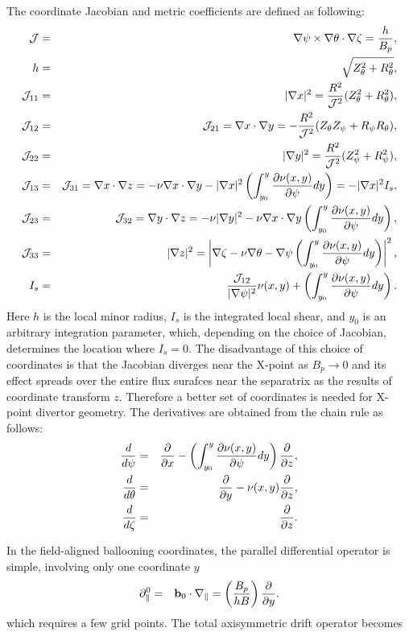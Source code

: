 \documentclass [11pt]{article}
\begin{document}
The coordinate Jacobian and metric coefficients are defined as following:
\begin{eqnarray}
{\cal J}&=&\nabla\psi\times\nabla\theta\cdot\nabla\zeta={h\over B_p}, \\
h&=&\sqrt{Z_\theta^2+R_\theta^2}, \\
{\cal J}_{11}&=&|\nabla x|^2={R^2\over {\cal J}^2}(Z_\theta^2+R_\theta^2), \\
{\cal J}_{12}&=&{\cal J}_{21}=\nabla x\cdot\nabla y=-{R^2\over {\cal J}^2}(Z_\theta Z_\psi+R_\psi R_\theta), \\
{\cal J}_{22}&=&|\nabla y|^2={R^2\over {\cal J}^2}(Z_\psi^2+R_\psi^2), \\
{\cal J}_{13}&=&{\cal J}_{31}=\nabla x\cdot\nabla z=-\nu\nabla x\cdot\nabla y-|\nabla x|^2\left(\int_{y_0}^y {\partial \nu(x,y)\over\partial\psi}dy\right)=-|\nabla x|^2I_s, \\
{\cal J}_{23}&=&{\cal J}_{32}=\nabla y\cdot\nabla z=-\nu|\nabla y|^2-\nu\nabla x\cdot\nabla y\left(\int_{y_0}^y {\partial \nu(x,y)\over\partial\psi}dy\right), \\
{\cal J}_{33}&=&|\nabla z|^2=\left |\nabla\zeta-\nu\nabla \theta-\nabla\psi\left(\int_{y_0}^y {\partial \nu(x,y)\over\partial\psi}dy\right)\right |^2, \\
I_s &=&  {{\cal J}_{12}\over|\nabla\psi|^2}\nu(x,y)+\left(\int_{y_0}^y {\partial \nu(x,y)\over\partial\psi}dy\right).
\end{eqnarray}
Here $h$ is the local minor radius, $I_s$ is the integrated local shear, and $y_0$ is an arbitrary integration parameter, which, depending on the choice of Jacobian, determines the location where $ I_s=0$. 
The disadvantage of this choice of coordinates is that
the Jacobian diverges near the X-point as $B_p\rightarrow 0$
and its effect spreads over the entire flux surafces
near the separatrix as the results of coordinate transform $z$.
Therefore a better set of coordinates is needed for X-point divertor geometry.
The derivatives are obtained from the chain rule as follows:
\begin{eqnarray}
{d\over d\psi}&=&{\partial\over \partial x} - \left(\int_{y_0}^y {\partial \nu(x,y)\over\partial\psi}dy\right){\partial\over \partial z},   \\ 
{d\over d\theta}&=&{\partial\over \partial y} - \nu(x,y){\partial\over \partial z},   \\ 
{d\over d\zeta}&=&{\partial\over \partial z}.
\end{eqnarray}

In the field-aligned ballooning coordinates, the parallel differential operator is simple, involving only one coordinate $y$
\begin{eqnarray}
\partial_\|^0 &=&  {\bf b}_0\cdot\nabla_\|=\left({B_p\over hB}\right){\partial\over\partial y}.
\end{eqnarray}
which requires a few grid points.
The total axisymmetric drift operator becomes
\end{document}
